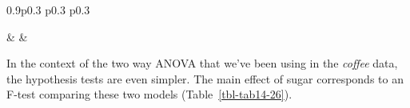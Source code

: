 \documentclass[
  a4paper,
]{book}
\begin{document}
\begin{table}[ht]
\begin{centerbox}
\begin{threeparttable}
\begin{tabularx}{0.9\textwidth}{p{} p{} p{}}
\hhline{}

 &
 &
 \tabularnewline[-0.5pt]


\end{tabularx} 

\end{threeparttable}\par\end{centerbox}

\end{table}
 

In the context of the two way ANOVA that we've been using in the
\emph{coffee} data, the hypothesis tests are even simpler. The main
effect of sugar corresponds to an F-test comparing these two models
(Table~\ref{tbl-tab14-26}).

\hypertarget{tbl-tab14-26}{}
 
  \providecommand{\huxb}[2]{\arrayrulecolor[RGB]{#1}\global\arrayrulewidth=#2pt}
  \providecommand{\huxvb}[2]{\color[RGB]{#1}\vrule width #2pt}
  \providecommand{\huxtpad}[1]{\rule{0pt}{#1}}
  \providecommand{\huxbpad}[1]{\rule[-#1]{0pt}{#1}}
\end{document}
